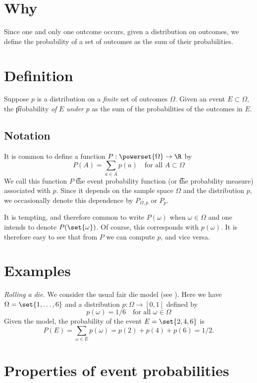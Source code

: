 
\section*{Why}

Since one and only one outcome occurs, given a distribution on outcomes, we define the probability of a set of outcomes as the sum of their probabilities.

\section*{Definition}

Suppose $p$ is a distribution on a \textit{finite} set of outcomes $\Omega $.
Given an event $E \subset \Omega $, the \t{probability} \textit{of} $E$ \textit{under} $p$ as the sum of the probabilities of the outcomes in $E$.

\subsection*{Notation}

It is common to define a function $P: \powerset{\Omega } \to \R $ by
\[
P(A) = \sum_{a \in A} p(a) \quad \text{for all } A \subset \Omega
\]
We call this function $P$ \t{the event probability function} (or \t{the probability measure}) associated with $p$.
Since it depends on the sample space $\Omega $ and the distribution $p$, we occasionally denote this dependence by $P_{\Omega , p}$ or $P_p$.

It is tempting, and therefore common to write $P(\omega )$ when $\omega  \in \Omega $ and one intends to denote $P(\set{\omega })$.
Of course, this corresponds with $p(\omega )$.
It is therefore easy to see that from $P$ we can compute $p$, and vice versa.

\section*{Examples}

\textit{Rolling a die.}
We consider the usual fair die model (see ).
Here we have $\Omega  = \set{1, \dots , 6}$ and a distribution $p: \Omega  \to [0,1]$ defined by
\[
p(\omega ) = 1/6 \quad \text{for all } \omega  \in \Omega
\]
Given the model, the probability of the event $E = \set{2, 4, 6}$ is
\[
\textstyle
P(E) = \sum_{\omega  \in E} p(\omega ) = p(2) + p(4) + p(6) = 1/2.
\]

\section*{Properties of event probabilities}

